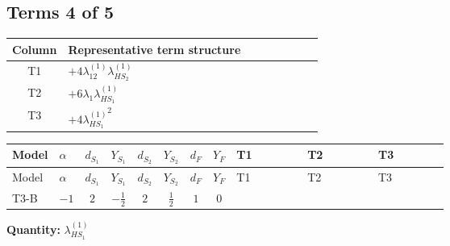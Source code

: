 \documentclass[8pt]{article}
\begin{document}
\begin{landscape}
\subsection*{Terms 4 of 5}
\begin{center}
\begin{tabular}{@{}c >{\raggedright\arraybackslash}p{0.82\linewidth}@{}}
\toprule
Column & Representative term structure \\
\midrule
T1 & \(\displaystyle +4 {\lambda_{12}^{(1)}} {\lambda_{HS_2}^{(1)}}\) \\
\midrule
T2 & \(\displaystyle +6 {\lambda_1} {\lambda_{HS_1}^{(1)}}\) \\
\midrule
T3 & \(\displaystyle +4 {\lambda_{HS_1}^{(1)}}^2\) \\
\midrule
\bottomrule
\end{tabular}
\end{center}
\smallskip
\tiny
\begin{longtable}{@{}llcccccc >{\raggedright\arraybackslash}p{0.21\linewidth} >{\raggedright\arraybackslash}p{0.21\linewidth} >{\raggedright\arraybackslash}p{0.21\linewidth}@{}}
\toprule
Model & $\alpha$ & $d_{S_1}$ & $Y_{S_1}$ & $d_{S_2}$ & $Y_{S_2}$ & $d_F$ & $Y_F$ & T1 & T2 & T3 \\
\midrule
\endfirsthead
\toprule
Model & $\alpha$ & $d_{S_1}$ & $Y_{S_1}$ & $d_{S_2}$ & $Y_{S_2}$ & $d_F$ & $Y_F$ & T1 & T2 & T3 \\
\midrule
\endhead
T3-B & $-1$ & $2$ & $-\frac{1}{2}$ & $2$ & $\frac{1}{2}$ & $1$ & $0$ & \scriptsize\adjustbox{max width=\linewidth}{$\begin{gathered} +4 {\lambda_{12}^{(1)}} {\lambda_{HS_2}^{(1)}}\end{gathered}$} & \scriptsize\adjustbox{max width=\linewidth}{$\begin{gathered} +6 {\lambda_1} {\lambda_{HS_1}^{(1)}}\end{gathered}$} & \scriptsize\adjustbox{max width=\linewidth}{$\begin{gathered} +4 {\lambda_{HS_1}^{(1)}}^2\end{gathered}$} \\
\midrule
\bottomrule
\end{longtable}
\clearpage
\noindent\textbf{Quantity: }$\lambda_{HS_1}^{(1)}$\par\smallskip

\end{landscape}
\end{document}
